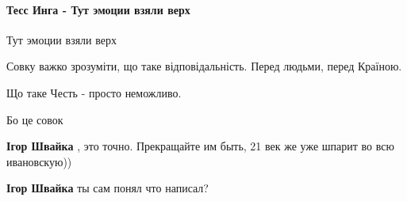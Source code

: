  
 
 
 
 
\paragraph{Тесс Инга - Тут эмоции взяли верх}

\begin{itemize}
 
Тут эмоции взяли верх

 

Совку важко зрозуміти, що таке відповідальність. Перед людьми, перед Країною.

Що таке Честь - просто неможливо.

Бо це совок 🙏

\begin{itemize}
 
\textbf{Ігор Швайка} , это точно.
Прекращайте им быть, 21 век же уже шпарит во всю ивановскую))

 
\textbf{Ігор Швайка} ты сам понял что написал?

 


\end{itemize}
\end{itemize}
